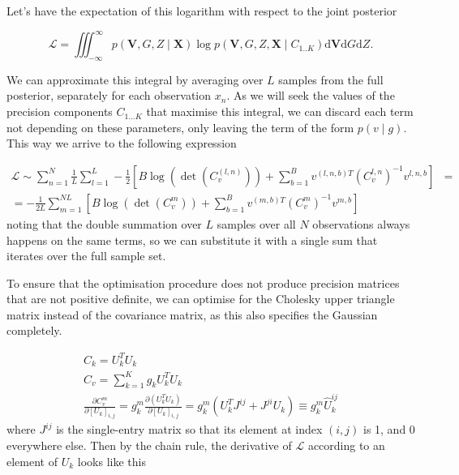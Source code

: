 \documentclass{paper}
\begin{document}
Let's have the expectation of this logarithm with respect to the joint posterior

\begin{equation}
\mathcal{L}=\iiint_{-\infty}^{\infty} p(\mathbf{V},G,Z \mid \mathbf{X})\log p(\mathbf{V},G,Z,\mathbf{X} \mid C_{1..K}) \mathrm{d}\mathbf{V}\mathrm{d}G\mathrm{d}Z. 
\end{equation}

We can approximate this integral by averaging over $L$ samples from the full posterior, separately for each observation $x_n$. As we will seek the values of the precision components $C_{1 \dots K}$ that maximise this integral, we can discard each term not depending on these parameters, only leaving the term of the form $p(v \mid g)$. This way we arrive to the following expression 

\begin{equation}
\begin{split}
\mathcal{L} \sim \sum_{n=1}^N \frac{1}{L} \sum_{l=1}^L -\frac{1}{2} \left[B \log \left( \det \left( C_v^{(l,n)} \right) \right) + \sum_{b=1}^B v^{(l,n,b)T}  \left( C_v^{l,n} \right)^{-1} v^{l,n,b}\right]& = \\
= -\frac{1}{2L} \sum_{m=1}^{NL} \left[B \log \left( \det \left( C_v^{m} \right) \right) + \sum_{b=1}^B v^{(m,b)T}  \left( C_v^{m} \right)^{-1} v^{m,b}\right]&
\end{split}
\end{equation}
%
noting that the double summation over $L$ samples over all $N$ observations always happens on the same terms, so we can substitute it with a single sum that iterates over the full sample set.

To ensure that the optimisation procedure does not produce precision matrices that are not positive definite, we can optimise for the Cholesky upper triangle matrix instead of the covariance matrix, as this also specifies the Gaussian completely.

\begin{eqnarray}
C_k = U_k^T U_k \\
C_v = \sum_{k=1}^K g_k U_k^T U_k \\
\frac{\partial C_v^m}{\partial \left[ U_k \right]_{i,j}} = g_k^m \frac{\partial \left( U_k^T U_k \right)}{\partial \left[ U_k \right]_{i,j}} = g_k^m \left( U_k^T J^{ij} + J^{ji} U_k \right) \equiv g_k^m \hat U_k^{ij}
\end{eqnarray}
%
where $J^{ij}$ is the single-entry matrix so that its element at index $(i,j)$ is 1, and 0 everywhere else. Then by the chain rule, the derivative of $\mathcal{L}$ according to an element of $U_k$ looks like this
\end{document}
